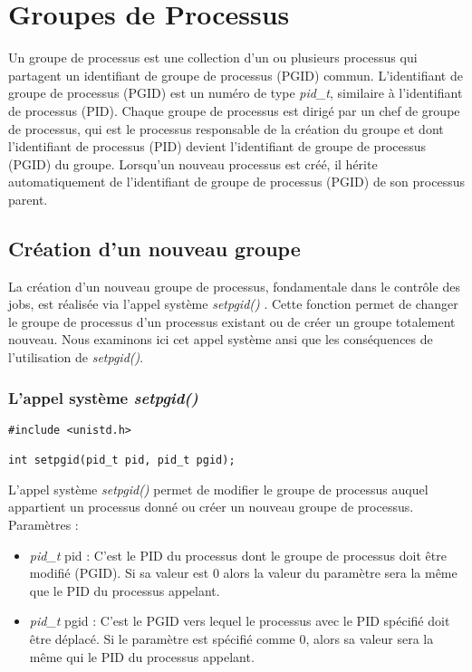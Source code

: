 \section{Groupes de Processus}
Un groupe de processus est une collection d’un ou plusieurs processus qui partagent un identifiant de groupe de processus (PGID) commun. L'identifiant de groupe de processus (PGID) est un numéro de type \textit{pid\_t}, similaire à l'identifiant de processus (PID). 
\newline
Chaque groupe de processus est dirigé par un chef de groupe de processus, qui est le processus responsable de la création du groupe et dont l'identifiant de processus (PID) devient l'identifiant de groupe de processus (PGID) du groupe. Lorsqu'un nouveau processus est créé, il hérite automatiquement de l'identifiant de groupe de processus (PGID) de son processus parent.
\newline
\subsection{Création d'un nouveau groupe}
La création d'un nouveau groupe de processus, fondamentale dans le contrôle des jobs, est réalisée via l'appel système \textit{setpgid()} . Cette fonction permet de changer le groupe de processus d'un processus existant ou de créer un groupe totalement nouveau. Nous examinons ici cet appel système ansi que les conséquences de l'utilisation de \textit{setpgid()}.

\subsubsection{L’appel système \textit{setpgid()} }
\begin{lstlisting}[frame=single]
#include <unistd.h>

int setpgid(pid_t pid, pid_t pgid);
\end{lstlisting}
L’appel système \textit{setpgid()} permet de modifier le groupe de processus auquel appartient un processus donné ou créer un nouveau groupe de processus.
\newline
Paramètres :
\begin{itemize}
\item\textit{pid\_t} pid : C’est le PID du processus dont le groupe de processus doit être modifié (PGID). Si sa valeur est 0 alors la valeur du paramètre sera la même que le PID du processus appelant.
\item \textit{pid\_t} pgid : C’est le PGID vers lequel le processus avec le PID spécifié doit être déplacé. Si le paramètre est spécifié comme 0, alors sa valeur sera la même qui le PID du processus appelant.
\end{itemize}

